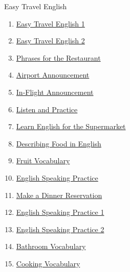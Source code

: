 \documentclass[11pt]{article}
\begin{document}
	\kaishu 
	\setcounter{section}{0}
	\begin{center}
		{\LARGE  Easy Travel English}
	\end{center}
\setcounter{page}{1}

\vspace{0.5cm}


\begin{multicols}{2}
	\begin{enumerate}
		\item \href{https://mp.weixin.qq.com/s/2tYGNMLE8n0yBsHt2c0YIg}{Easy Travel English 1}	%
		\item \href{https://mp.weixin.qq.com/s/5Aw-Pwk4ENLapKLXBbyA5Q}{Easy Travel English 2}	%
		\item \href{https://mp.weixin.qq.com/s/w_VRoh5BVcNM2ok3zro2KA}{Phrases for the Restaurant}	%
		\item \href{https://mp.weixin.qq.com/s/aCzKF89u0TagrPDmHLq9iA}{Airport Announcement}	%
		\item \href{https://mp.weixin.qq.com/s/-Y5tqcXryEpg_Cuem5JhfA}{In-Flight Announcement}	%
		\item \href{https://mp.weixin.qq.com/s/AYuf181nXVksC_ctcoZdww}{Listen and Practice}	%
		\item \href{https://mp.weixin.qq.com/s/aCwMQSmHH0jZDIpl4vKARQ}{Learn English for the Supermarket}	%
		\item \href{https://mp.weixin.qq.com/s/zYjuIjII41m7GUKExqLV5w}{Describing Food in English}	%
		\item \href{https://mp.weixin.qq.com/s/MiTVbH5QYbYEjZOArJCoVQ}{Fruit Vocabulary}	%
		\item \href{https://mp.weixin.qq.com/s/-8aWeuLPwSe5qFU7Y_l06g}{English Speaking Practice}	%
		\item \href{https://mp.weixin.qq.com/s/D49_9oqeL_26FfIxwzgDhA}{Make a Dinner Reservation}	%
		\item \href{https://mp.weixin.qq.com/s/fBV4d62DgifMHn1UmqdUmw}{English Speaking Practice 1}	%
		\item \href{https://mp.weixin.qq.com/s/oGaaWUzkcNJ7-6C7NHkUFw}{English Speaking Practice 2}	%
		\item \href{https://mp.weixin.qq.com/s/QuSNJvaIThCv_FOuBiVRKQ}{Bathroom Vocabulary}	%
		\item \href{https://mp.weixin.qq.com/s/62C8Iqwcl0-IvhoP85c41g}{Cooking Vocabulary}	%
	\end{enumerate}
\end{multicols}
\end{document}
